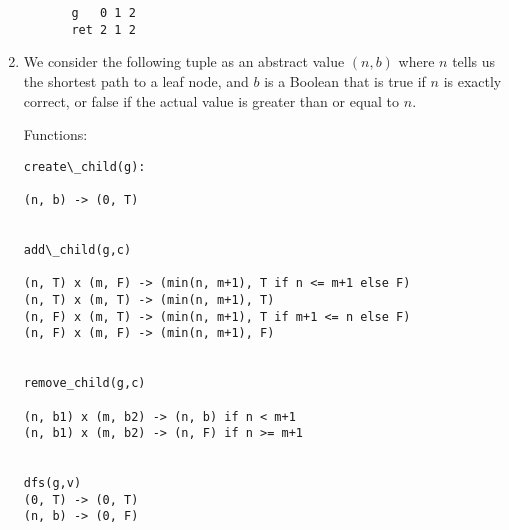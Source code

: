 \begin{enumerate}[label=(\alph*)]
\begin{enumerate}[label=(\roman*)]
\begin{enumerate}[label=(\Alph*)]
\begin{verbatim}
g   0 1 2
ret 2 1 2
\end{verbatim}
          \end{enumerate}


        
    \end{enumerate}

          \item

            We consider the following tuple as an abstract value $(n, b)$ where $n$ tells us the shortest path to a leaf node, and $b$ is a Boolean that is true if $n$ is exactly correct, or false if the actual value is greater than or equal to $n$.

            Functions:

\begin{verbatim}
create\_child(g):

(n, b) -> (0, T)


add\_child(g,c)

(n, T) x (m, F) -> (min(n, m+1), T if n <= m+1 else F)
(n, T) x (m, T) -> (min(n, m+1), T)
(n, F) x (m, T) -> (min(n, m+1), T if m+1 <= n else F)
(n, F) x (m, F) -> (min(n, m+1), F)


remove_child(g,c)

(n, b1) x (m, b2) -> (n, b) if n < m+1
(n, b1) x (m, b2) -> (n, F) if n >= m+1


dfs(g,v)
(0, T) -> (0, T)
(n, b) -> (0, F)
\end{verbatim}

      
  \end{enumerate}

